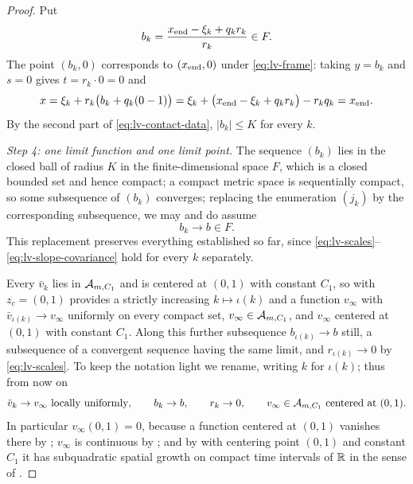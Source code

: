 \begin{proof}
Put
\[
  b_k=\frac{x_{\rm end}-\xi_k+q_kr_k}{r_k}\in F .
\]
The point $(b_k,0)$ corresponds to $(x_{\rm end},0)$ under
\eqref{eq:lv-frame}: taking $y=b_k$ and $s=0$ gives $t=r_k\cdot0=0$ and
\[
  x=\xi_k+r_k\bigl(b_k+q_k(0-1)\bigr)
   =\xi_k+\bigl(x_{\rm end}-\xi_k+q_kr_k\bigr)-r_kq_k=x_{\rm end}.
\]
By the second part of \eqref{eq:lv-contact-data}, $|b_k|\le K$ for every $k$.

\emph{Step 4: one limit function and one limit point.}
The sequence $(b_k)$ lies in the closed ball of radius $K$ in the
finite-dimensional space $F$, which is a closed bounded set and hence compact;
a compact metric space is sequentially compact, so some subsequence of $(b_k)$
converges; replacing the enumeration $(j_k)$ by the corresponding subsequence,
we may and do assume
\begin{equation}\label{eq:lv-base-limit}
  b_k\longrightarrow b\in F .
\end{equation}
This replacement preserves everything established so far, since
\eqref{eq:lv-scales}--\eqref{eq:lv-slope-covariance} hold for every $k$
separately.

Every $\bar v_k$ lies in $\mathcal{A}_{m,C_1}$ and is centered at $(0,1)$ with
constant $C_1$, so  with $z_c=(0,1)$ provides a
strictly increasing $k\mapsto\iota(k)$ and a function $v_\infty$ with
$\bar v_{\iota(k)}\to v_\infty$ uniformly on every compact set,
$v_\infty\in\mathcal{A}_{m,C_1}$, and $v_\infty$ centered at $(0,1)$ with constant
$C_1$. Along this further subsequence $b_{\iota(k)}\to b$ still, a subsequence
of a convergent sequence having the same limit, and $r_{\iota(k)}\to0$ by
\eqref{eq:lv-scales}. To keep the notation light we rename, writing $k$ for
$\iota(k)$; thus from now on
\begin{equation}\label{eq:lv-limits}
  \bar v_k\to v_\infty\ \text{locally uniformly},\qquad
  b_k\to b,\qquad r_k\to0,\qquad
  v_\infty\in\mathcal{A}_{m,C_1}\ \text{centered at }(0,1).
\end{equation}
In particular $v_\infty(0,1)=0$, because a function centered at $(0,1)$ vanishes
there by ; $v_\infty$ is continuous by
; and by
 with centering point $(0,1)$ and constant $C_1$ it
has subquadratic spatial growth on compact time intervals of $\mathbb{R}$ in the sense
of .


\end{proof}

